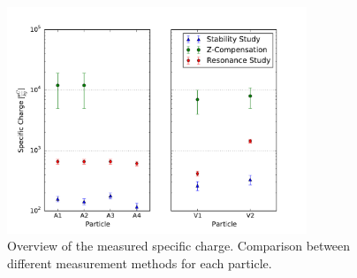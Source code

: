 \documentclass[
	paper=A4,
	parskip=full,
	chapterprefix=true,
	11pt,
	headings=normal,
	bibliography=totoc,
	listof=totoc,
	titlepage=on,
]{scrreprt}
\begin{document}
\begin{figure}
	\centering
	\includegraphics[width=0.8\textwidth]{paul_compareresults}
	\caption{Overview of the measured specific charge. Comparison between different measurement methods for each particle.}
	\label{fig:comp_results}
\end{figure}	

\cleardoublepage


{}
\end{document}
